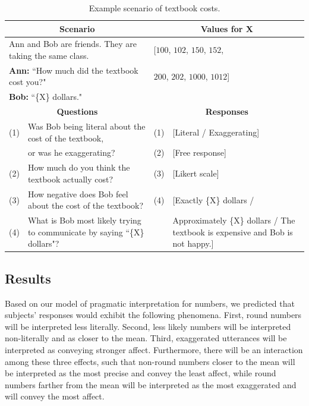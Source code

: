 \documentclass{article} %
\begin{document}
\begin{table}[h]
\begin{tabular}{| p{0.15cm}  p{8.15cm}| p{0.15cm}p{4cm} |}\hline
\multicolumn{2}{|c|}{\textbf{Scenario}} & \multicolumn{2}{c|}{\textbf{Values for X}} \\\hline
\multicolumn{2}{|l|}{Ann and Bob are friends. They are taking the same class.} & \multicolumn{2}{l|}{[$100$, $102$, $150$, $152$,}\\
\multicolumn{2}{|l|}{\textbf{Ann:} ``How much did the textbook cost you?"} & \multicolumn{2}{l|}{$200$, $202$, $1000$, $1012$]}\\
\multicolumn{2}{|l|}{\textbf{Bob:} ``\{X\} dollars."} & \multicolumn{2}{l|}{}\\\hline
\multicolumn{2}{|c|}{\textbf{Questions}} & \multicolumn{2}{c|}{\textbf{Responses}} \\\hline
(1) & Was Bob being literal about the cost of the textbook, & (1) &[Literal / Exaggerating] \\
 & or was he exaggerating? & (2) & [Free response] \\
(2) & How much do you think the textbook actually cost? & (3) & [Likert scale] \\
(3) & How negative does Bob feel about the cost of the textbook? & (4) & [Exactly \{X\} dollars / \\
(4) & What is Bob most likely trying to communicate by saying  ``\{X\} dollars"? & & Approximately \{X\} dollars / The textbook is expensive and Bob is not happy.]\\\hline
\end{tabular}
\caption{Example scenario of textbook costs.}
\label{tab:myfirsttable}
\end{table}


\subsection{Results}




Based on our model of pragmatic interpretation for numbers, we predicted that subjects' responses would exhibit the following phenomena. First, round numbers will be interpreted less literally. Second, less likely numbers will be interpreted non-literally and as closer to the mean. Third, exaggerated utterances will be interpreted as conveying stronger affect. Furthermore, there will be an interaction among these three effects, such that non-round numbers closer to the mean will be interpreted as the most precise and convey the least affect, while round numbers farther from the mean will be interpreted as the most exaggerated and will convey the most affect.
\end{document}
